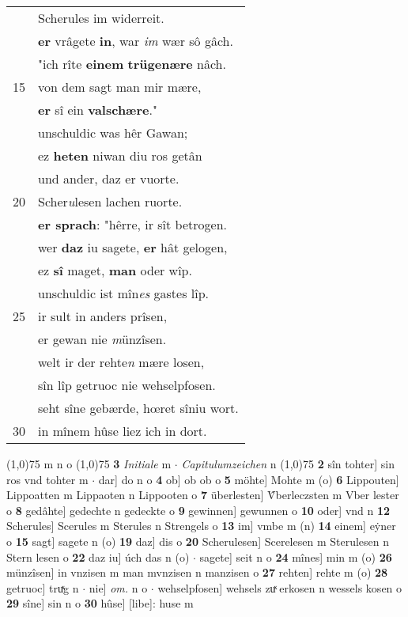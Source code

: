 \documentclass[8pt,a4paper,notitlepage]{article}
\begin{document}
\begin{table}[ht]
\begin{minipage}[t]{0.5\linewidth}
\begin{tabular}{rl}
 & Scherules im widerreit.\\ 
 & \textbf{er} vrâgete \textbf{in}, war \textit{im} wær sô gâch.\\ 
 & "ich rîte \textbf{einem} \textbf{trügenære} nâch.\\ 
15 & von dem sagt man mir mære,\\ 
 & \textbf{er} sî ein \textbf{valschære}."\\ 
 & unschuldic was hêr Gawan;\\ 
 & ez \textbf{heten} niwan diu ros getân\\ 
 & und ander, daz er vuorte.\\ 
20 & Scher\textit{u}lesen lachen ruorte.\\ 
 & \textbf{er sprach}: "hêrre, ir sît betrogen.\\ 
 & wer \textbf{daz} iu sagete, \textbf{er} hât gelogen,\\ 
 & ez \textbf{sî} maget, \textbf{man} oder wîp.\\ 
 & unschuldic ist mîn\textit{es} gastes lîp.\\ 
25 & ir sult in anders prîsen,\\ 
 & er gewan nie \textit{m}ünzîsen.\\ 
 & welt ir der rehte\textit{n} mære losen,\\ 
 & sîn lîp getruoc nie wehselpfosen.\\ 
 & seht sîne gebærde, hœret sîniu wort.\\ 
30 & in mînem hûse liez ich in dort.\\ 
\end{tabular}
\scriptsize
\line(1,0){75} \newline
m n o \newline
\line(1,0){75} \newline
\textbf{3} \textit{Initiale} m   $\cdot$ \textit{Capitulumzeichen} n  \newline
\line(1,0){75} \newline
\textbf{2} sîn tohter] sin ros vnd tohter m  $\cdot$ dar] do n o \textbf{4} ob] ob ob o \textbf{5} möhte] Mohte m (o) \textbf{6} Lippouten] Lippoatten m Lippaoten n Lippooten o \textbf{7} überlesten] V̂berleczsten m Vber lester o \textbf{8} gedâhte] gedechte n gedeckte o \textbf{9} gewinnen] gewunnen o \textbf{10} oder] vnd n \textbf{12} Scherules] Scerules m Sterules n Strengels o \textbf{13} im] vmbe m (n) \textbf{14} einem] eẏner o \textbf{15} sagt] sagete n (o) \textbf{19} daz] dis o \textbf{20} Scherulesen] Scerelesen m Sterulesen n Stern lesen o \textbf{22} daz iu] úch das n (o)  $\cdot$ sagete] seit n o \textbf{24} mînes] min m (o) \textbf{26} münzîsen] in vnzisen m man mvnzisen n manzisen o \textbf{27} rehten] rehte m (o) \textbf{28} getruoc] truͯg n  $\cdot$ nie] \textit{om.} n o  $\cdot$ wehselpfosen] wehsels zuͯ erkosen n wessels kosen o \textbf{29} sîne] sin n o \textbf{30} hûse] [libe]: huse m \newline
\end{minipage}
\end{table}
\end{document}
